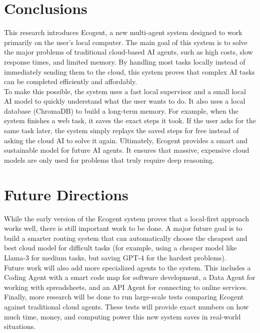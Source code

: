\section{Conclusions}
This research introduces Ecogent, a new multi-agent system designed to work primarily on the user's local computer. The main goal of this system is to solve the major problems of traditional cloud-based AI agents, such as high costs, slow response times, and limited memory. By handling most tasks locally instead of immediately sending them to the cloud, this system proves that complex AI tasks can be completed efficiently and affordably.\\

To make this possible, the system uses a fast local supervisor and a small local AI model to quickly understand what the user wants to do. It also uses a local database (ChromaDB) to build a long-term memory. For example, when the system finishes a web task, it saves the exact steps it took. If the user asks for the same task later, the system simply replays the saved steps for free instead of asking the cloud AI to solve it again. Ultimately, Ecogent provides a smart and sustainable model for future AI agents. It ensures that massive, expensive cloud models are only used for problems that truly require deep reasoning.\\

\section{Future Directions}
While the early version of the Ecogent system proves that a local-first approach works well, there is still important work to be done. A major future goal is to build a smarter routing system that can automatically choose the cheapest and best cloud model for difficult tasks (for example, using a cheaper model like Llama-3 for medium tasks, but saving GPT-4 for the hardest problems).\\

Future work will also add more specialized agents to the system. This includes a Coding Agent with a smart code map for software development, a Data Agent for working with spreadsheets, and an API Agent for connecting to online services. Finally, more research will be done to run large-scale tests comparing Ecogent against traditional cloud agents. These tests will provide exact numbers on how much time, money, and computing power this new system saves in real-world situations.\\

